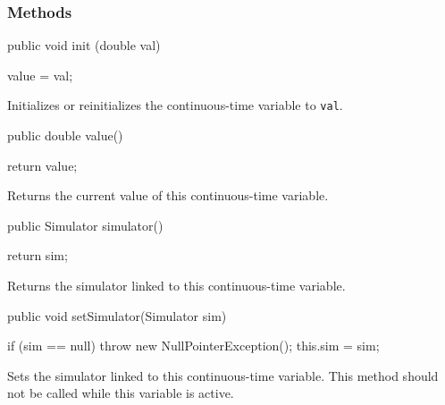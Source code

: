 \subsubsection* {Methods}
\begin{code}

   public void init (double val) \begin{hide} {
      value = val;
   } \end{hide}
\end{code}
 \begin{tabb}   Initializes or reinitializes the continuous-time variable
   to \texttt{val}.
 \end{tabb}
\begin{htmlonly}
\end{htmlonly}
\begin{code}

   public double value() \begin{hide} {
      return value;
   } \end{hide}
\end{code}
 \begin{tabb}   Returns the current value of this continuous-time variable.
 \end{tabb}
\begin{htmlonly}
\end{htmlonly}
\begin{code}

   public Simulator simulator() \begin{hide} {
      return sim;
   } \end{hide}
\end{code}
 \begin{tabb}   Returns the simulator linked to this continuous-time variable.
 \end{tabb}
\begin{htmlonly}
\end{htmlonly}
\begin{code}

   public void setSimulator(Simulator sim) \begin{hide} {
       if (sim == null)
          throw new NullPointerException();
      this.sim = sim;
   } \end{hide}
\end{code}
 \begin{tabb}   Sets the simulator linked to this continuous-time variable.
   This method should not be called while this variable is active.
 \end{tabb}
